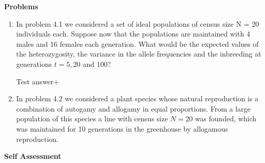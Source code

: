 \documentclass[12pt]{amsart}
\begin{document}
{\large \bf Problems}   
\begin{enumerate}
\item In problem 4.1 we considered a set of ideal populations of census size N = 20 individuals each. Suppose now that the populations are maintained with 4 males and 16 females each generation. What would be the expected values of the heterozygosity, the variance in the allele frequencies and the inbreeding at generations $t = 5, 20$ and $100$?

Test answer+

\item In problem 4.2 we considered a plant species whose natural reproduction is a combination of autogamy and allogamy in equal proportions. From a large population of this species a line with census size $N = 20$ was founded, which was maintained for 10 generations in the greenhouse by allogamous reproduction. 
\end{enumerate}


{\large \bf Self Assessment}


\medskip
\end{document}
